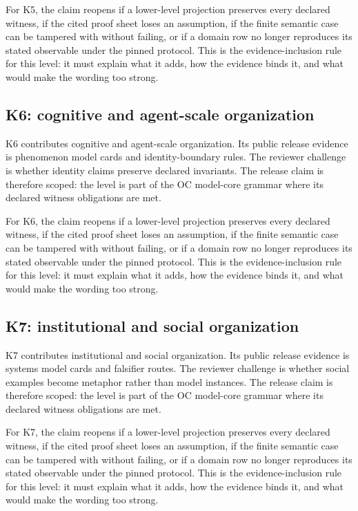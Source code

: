 For K5, the claim reopens if a lower-level projection preserves every declared witness, if the cited proof sheet loses an assumption, if the finite semantic case can be tampered with without failing, or if a domain row no longer reproduces its stated observable under the pinned protocol. This is the evidence-inclusion rule for this level: it must explain what it adds, how the evidence binds it, and what would make the wording too strong.


\subsection{K6: cognitive and agent-scale organization}

K6 contributes cognitive and agent-scale organization. Its public release evidence is phenomenon model cards and identity-boundary rules. The reviewer challenge is whether identity claims preserve declared invariants. The release claim is therefore scoped: the level is part of the OC model-core grammar where its declared witness obligations are met.


For K6, the claim reopens if a lower-level projection preserves every declared witness, if the cited proof sheet loses an assumption, if the finite semantic case can be tampered with without failing, or if a domain row no longer reproduces its stated observable under the pinned protocol. This is the evidence-inclusion rule for this level: it must explain what it adds, how the evidence binds it, and what would make the wording too strong.


\subsection{K7: institutional and social organization}

K7 contributes institutional and social organization. Its public release evidence is systems model cards and falsifier routes. The reviewer challenge is whether social examples become metaphor rather than model instances. The release claim is therefore scoped: the level is part of the OC model-core grammar where its declared witness obligations are met.


For K7, the claim reopens if a lower-level projection preserves every declared witness, if the cited proof sheet loses an assumption, if the finite semantic case can be tampered with without failing, or if a domain row no longer reproduces its stated observable under the pinned protocol. This is the evidence-inclusion rule for this level: it must explain what it adds, how the evidence binds it, and what would make the wording too strong.


